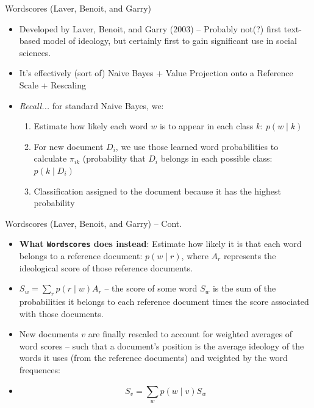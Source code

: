 \documentclass[
  ignorenonframetext,
  aspectratio=169]{beamer}
\begin{document}
\begin{frame}{Wordscores (Laver, Benoit, and Garry)}
\label{wordscores-laver-benoit-and-garry}
\begin{itemize}
\item Developed by Laver, Benoit, and Garry (2003) -- Probably not(?) first text-based model of ideology, but certainly first to gain significant use in social sciences. \par \vspace{2.5mm}
\item It’s effectively (sort of) Naive Bayes + Value Projection onto a Reference Scale + Rescaling \par \vspace{2.5mm} \pause 
\item \textit{Recall...} for standard Naive Bayes, we: 
\begin{enumerate}
  \item Estimate how likely each word $w$ is to appear in each class $k$: $p(w\mid k)$ \pause
  \item For new document $D_{i}$, we use those learned word probabilities to calculate $\pi_{ik}$ (probability that $D_{i}$ belongs in each possible class: $p(k\mid D_i)$ \pause
  \item Classification assigned to the document because it has the highest probability
\end{enumerate}
\end{itemize}
\end{frame}

\begin{frame}{Wordscores (Laver, Benoit, and Garry) -- Cont.}
\label{wordscores-laver-benoit-and-garry-cont.}
\begin{itemize}
  \item \textbf{What \texttt{Wordscores} does instead}: Estimate how likely it is that each word belongs to a reference document: $p(w\mid r)$, where $A_{r}$ represents the ideological score of those reference documents. \par \vspace{2.5mm} \pause 
  \item $ S_{w} = \sum_{r}p(r\mid w)A_{r} $ --  the score of some word $S_{w}$ is the sum of the probabilities it belongs to each reference document times the score associated with those documents. \par \vspace{2.5mm} \pause
  \item New documents $v$ are finally rescaled to account for weighted averages of word scores -- such that a document's position is the average ideology of the words it uses (from the reference documents) and weighted by the word frequences: 
  \item[] $$ S_{v} = \sum_{w}p(w\mid v)S_{w} $$
\end{itemize}
\end{frame}
\end{document}
